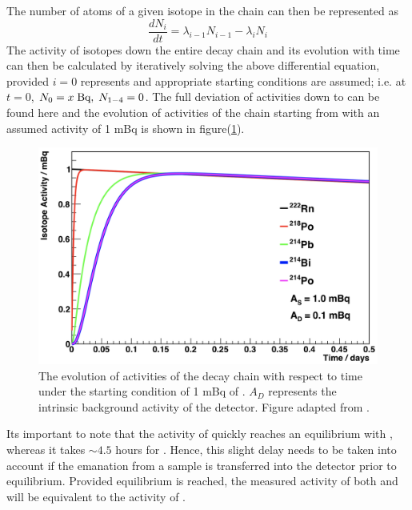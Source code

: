 The number of atoms of a given isotope in the chain can then be represented as 
%
\begin{equation}
    \frac{dN_{i}}{dt} = \lambda_{i-1}N_{i-1} - \lambda_{i}N_{i}
    \label{eq:isotopic_chance_in_chain}
\end{equation}
%
The activity of isotopes down the entire decay chain and its evolution with time can then be calculated by iteratively solving the above differential equation, provided $i=0$ represents \RnTTT{} and appropriate starting conditions are assumed; i.e. at $t=0$, $N_{0}= x \; \text{Bq}, \; N_{1-4} = 0$. The full deviation of activities down to \PoTOF{} can be found here \cite{mott_2013} and the evolution of activities of the chain starting from \RnTTT{} with an assumed activity of 1 mBq is shown in figure(\ref{fig:radon_chain_activity_evolution}).
%
\begin{figure}[t!]
    \centering
    \includegraphics[scale=0.40]{Chapter_4/Figures/radon_chain_activities.png}
    \caption[The evolution of activities of the \RnTTT{} decay chain with respect to time under the starting condition of 1 mBq of \RnTTT{}.]
    {The evolution of activities of the \RnTTT{} decay chain with respect to time under the starting condition of 1 mBq of \RnTTT{}. $A_{D}$ represents the intrinsic background activity of the detector. Figure adapted from \cite{mott_2013}.}
    \label{fig:radon_chain_activity_evolution}
\end{figure}
%
Its important to note that the activity of \PoTOE{} quickly reaches an equilibrium with \RnTTT{}, whereas it takes $\sim4.5$ hours for \PoTOF{}. Hence, this slight delay needs to be taken into account if the emanation from a sample is transferred into the detector prior to equilibrium. Provided equilibrium is reached, the measured activity of both \PoTOE{} and \PoTOF{} will be equivalent to the activity of \RnTTT{}.


